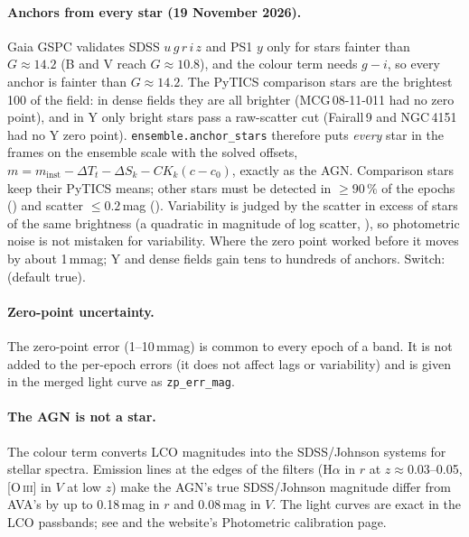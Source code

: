\documentclass[12pt,a4paper]{article}
\begin{document}
\paragraph{Anchors from every star (19 November 2026).}  Gaia GSPC validates SDSS $u\,g\,r\,i\,z$ and
PS1 $y$ only for stars fainter than $G\approx14.2$ (B and V reach $G\approx10.8$), and the colour term
needs $g-i$, so every anchor is fainter than $G\approx14.2$.  The PyTICS comparison stars are the
brightest 100 of the field: in dense fields they are all brighter (MCG\,08-11-011 had no zero point), and
in Y only bright stars pass a raw-scatter cut (Fairall\,9 and NGC\,4151 had no Y zero point).
\texttt{ensemble.anchor\_stars} therefore puts \emph{every} star in the frames on the ensemble scale with
the solved offsets, $m = m_\mathrm{inst} - \Delta T_t - \Delta S_k - CK_k(c - c_0)$, exactly as the AGN.
Comparison stars keep their PyTICS means; other stars must be detected in $\geq 90\,\%$ of the epochs
() and scatter $\leq 0.2$\,mag ().  Variability is
judged by the scatter in excess of stars of the same brightness (a quadratic in magnitude of
log scatter, ), so photometric noise is not mistaken for variability.  Where
the zero point worked before it moves by about 1\,mmag; Y and dense fields gain tens to hundreds of
anchors.  Switch:  (default true).

\paragraph{Zero-point uncertainty.}  The zero-point error (1--10\,mmag) is common to every epoch of a band.
It is not added to the per-epoch errors (it does not affect lags or variability) and is given in the merged
light curve as \texttt{zp\_err\_mag}.

\paragraph{The AGN is not a star.}  The colour term converts LCO magnitudes into the SDSS/Johnson systems
for stellar spectra.  Emission lines at the edges of the filters (H$\alpha$ in $r$ at $z\approx0.03$--0.05,
[O\,\textsc{iii}] in $V$ at low $z$) make the AGN's true SDSS/Johnson magnitude differ from AVA's by up to
0.18\,mag in $r$ and 0.08\,mag in $V$.  The light curves are exact in the LCO passbands; see
 and the website's Photometric calibration page.
\end{document}
